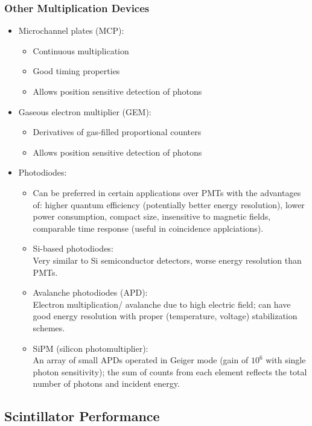 \subsubsection{Other Multiplication Devices}
\begin{itemize}
    \item Microchannel plates (MCP): 
    \begin{itemize}
        \item Continuous multiplication
        \item Good timing properties
        \item Allows position sensitive detection of photons
    \end{itemize}
    \item Gaseous electron multiplier (GEM):
    \begin{itemize}
        \item Derivatives of gas-filled proportional counters
        \item Allows position sensitive detection of photons
    \end{itemize}
    \item Photodiodes:
    \begin{itemize}
        \item Can be preferred in certain applications over PMTs with the advantages of: higher quantum efficiency (potentially better energy resolution), lower power consumption, compact size, insensitive to magnetic fields, comparable time response (useful in coincidence applciations).
        \item Si-based photodiodes:\\
        Very similar to Si semiconductor detectors, worse energy resolution than PMTs.
        \item Avalanche photodiodes (APD):\\
        Electron multiplication/ avalanche due to high electric field; can have good energy resolution with proper (temperature, voltage) stabilization schemes. 
        \item SiPM (silicon photomultiplier):\\
        An array of small APDs operated in Geiger mode (gain of $10^6$ with single photon sensitivity); the sum of counts from each element reflects the total number of photons and incident energy.
    \end{itemize}
\end{itemize}

\subsection{Scintillator Performance}
